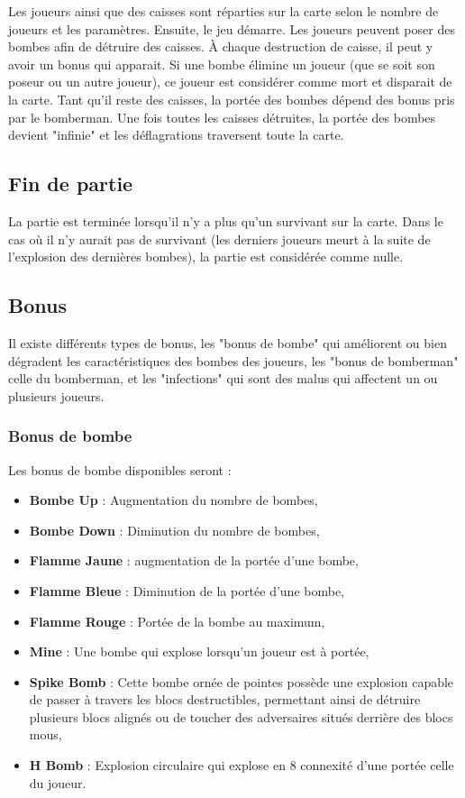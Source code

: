 Les joueurs ainsi que des caisses sont réparties sur la carte selon le nombre de joueurs et les paramètres. Ensuite, le jeu démarre. Les joueurs peuvent poser des bombes afin de détruire des caisses. À chaque destruction de caisse, il peut y avoir un bonus qui apparait. Si une bombe élimine un joueur (que se soit son poseur ou un autre joueur), ce joueur est considérer comme mort et disparait de la carte. Tant qu'il reste des caisses, la portée des bombes dépend des bonus pris par le bomberman. Une fois toutes les caisses détruites, la portée des bombes devient "infinie" et les déflagrations traversent toute la carte.

\subsection{Fin de partie}

La partie est terminée lorsqu'il n'y a plus qu'un survivant sur la carte. Dans le cas où il n'y aurait pas de survivant (les derniers joueurs meurt à la suite de l'explosion des dernières bombes), la partie est considérée comme nulle.

\subsection{Bonus}

Il existe différents types de bonus, les "bonus de bombe" qui améliorent ou bien dégradent les caractéristiques des bombes des joueurs, les "bonus de bomberman" celle du bomberman, et les "infections" qui sont des malus qui affectent un ou plusieurs joueurs.

\subsubsection{Bonus de bombe}

Les bonus de bombe disponibles seront :
\begin{itemize}
\item \textbf{Bombe Up} : Augmentation du nombre de bombes,
\item \textbf{Bombe Down} : Diminution du nombre de bombes,
\item \textbf{Flamme Jaune} : augmentation de la portée d'une bombe,
\item \textbf{Flamme Bleue} : Diminution de la portée d'une bombe,
\item \textbf{Flamme Rouge} : Portée de la bombe au maximum,
\item \textbf{Mine} : Une bombe qui explose lorsqu'un joueur est à portée,
\item \textbf{Spike Bomb} : Cette bombe ornée de pointes possède une explosion capable de passer à travers les blocs destructibles, permettant ainsi de détruire plusieurs blocs alignés ou de toucher des adversaires situés derrière des blocs mous,
\item \textbf{H Bomb} : Explosion circulaire qui explose en 8 connexité d'une portée celle du joueur.
\end{itemize}


